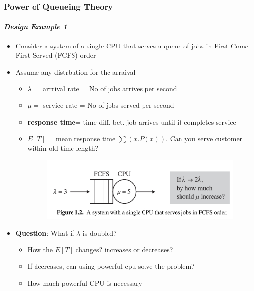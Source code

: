 \documentclass{beamer}
\begin{document}
\begin{frame}
    \frametitle{Power of Queueing Theory}
    \framesubtitle{\textbf{\textit{Design Example 1}}}
	\begin{itemize}
		\item Consider a  system  of a single CPU that serves a queue of jobs in First-Come- 								First-Served (FCFS) order
		\item Assume any distrbution for the arraival 
		\begin{itemize}
			\item $\lambda = $ arrrival rate = No of jobs arrives per second
			\item $\mu = $ service rate  = No of jobs served per second
			\item \textbf{response time}= time diff. bet. job arrives until it completes service
			\item $E[T]$ = mean response time $\sum(x. P(x))$. Can you serve customer within old 							time length?
			\begin{figure}
        		\begin{center}
		            \includegraphics[scale=0.12]{images/simplequeue.jpg}
        		\end{center}
		    \end{figure}
		\end{itemize}
		\item \textbf{Question}: What if $\lambda  $ is doubled? 
			\begin{itemize}
			\item How the $E[T]$ changes? increases or decreases? 
			\item If decreases, can using powerful cpu solve the problem?
			\item How much powerful CPU is necessary
			\end{itemize}
	\end{itemize}	    
    
\end{frame}
\end{document}
